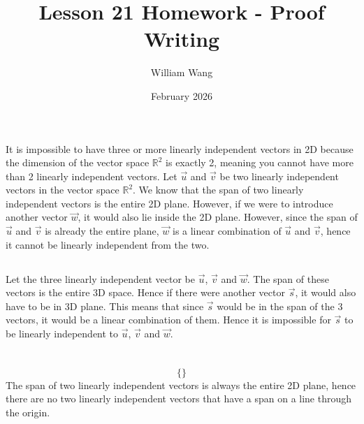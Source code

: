 \documentclass{article}
\title{Lesson 21 Homework - Proof Writing}
\author{William Wang}
\date{February 2026}
\begin{document}
\maketitle

\section{}

\subsection{}
It is impossible to have three or more linearly independent vectors in 2D because the dimension of the vector space \(\mathbb{R}^2\) is exactly 2, meaning you cannot have more than 2 linearly independent vectors. Let \(\vec{u}\) and \(\vec{v}\) be two linearly independent vectors in the vector space \(\mathbb{R}^2\). We know that the span of two linearly independent vectors is the entire 2D plane. However, if we were to introduce another vector \(\vec{w}\), it would also lie inside the 2D plane. However, since the span of $\vec{u}$ and \(\vec{v}\) is already the entire plane, \(\vec{w}\) is a linear combination of \(\vec{u}\) and \(\vec{v}\), hence it cannot be linearly independent from the two. 
\subsection{}
Let the three linearly independent vector be \(\vec{u}\), \(\vec{v}\) and \(\vec{w}\). The span of these vectors is the entire 3D space. Hence if there were another vector \(\vec{s}\), it would also have to be in 3D plane. This means that since \(\vec{s}\) would be in the span of the 3 vectors, it would be a linear combination of them. Hence it is impossible for \(\vec{s}\) to be linearly independent to \(\vec{u}\), \(\vec{v}\) and \(\vec{w}\). 
\section{}
\subsection{}
\[\{\}\]
The span of two linearly independent vectors is always the entire 2D plane, hence there are no two linearly independent vectors that have a span on a line through the origin. 
\end{document}
